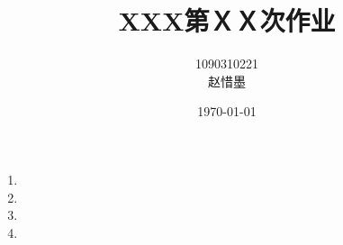 \documentclass[10pt,a4paper,titlepage]{article}
\begin{document}
\author{1090310221\\赵惜墨}
\title{XXX第ＸＸ次作业}
\date{\today}
\maketitle
\tableofcontents
\newpage


\begin{enumerate}[(1).]

\item

\item 

\item 

\item

\end{enumerate}
\end{document}
